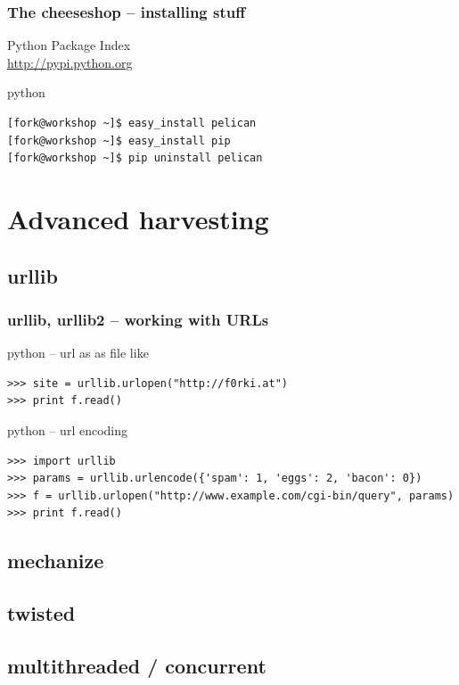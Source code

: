 \documentclass{beamer}
\begin{document}
\begin{frame}[fragile]
	\frametitle{The cheeseshop -- installing stuff}
	Python Package Index\\
	\url{http://pypi.python.org}
	\begin{exampleblock}{python}
	\begin{lstlisting}[language=bash]
[fork@workshop ~]$ easy_install pelican
[fork@workshop ~]$ easy_install pip
[fork@workshop ~]$ pip uninstall pelican
	\end{lstlisting}
	\end{exampleblock}
\end{frame}

\section{Advanced harvesting}


\subsection*{urllib}	%
\begin{frame}[fragile]
	\frametitle{urllib, urllib2 -- working with URLs}
	\begin{exampleblock}{python -- url as as file like}
	\begin{lstlisting}
>>> site = urllib.urlopen("http://f0rki.at")
>>> print f.read()
	\end{lstlisting}
	\end{exampleblock}
\pause	
	\begin{exampleblock}{python -- url encoding}
	\begin{lstlisting}
>>> import urllib
>>> params = urllib.urlencode({'spam': 1, 'eggs': 2, 'bacon': 0})
>>> f = urllib.urlopen("http://www.example.com/cgi-bin/query", params)
>>> print f.read()
	\end{lstlisting}
	\end{exampleblock}
\end{frame}

\subsection*{mechanize} %
\subsection*{twisted}	%
\subsection*{multithreaded / concurrent}	%
\end{document}
